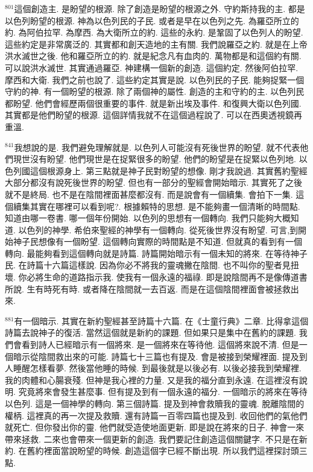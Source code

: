 \documentclass{book}
\begin{document}
$^{801}$這個創造主.
是盼望的根源.
除了創造是盼望的根源之外.
守約斯持我的主.
都是以色列盼望的根源.
神為以色列民的子民.
或者是早在以色列之先.
為羅亞所立的約.
為阿伯拉罕.
為摩西.
為大衛所立的約.
這些的永約.
是鞏固了以色列人的盼望.
這些約定是非常廣泛的.
其實都和創天造地的主有關.
我們說羅亞之約.
就是在上帝洪水滅世之後.
他和羅亞所立的約.
就是紀念凡有血肉的.
萬物都是和這個約有關.
可以說洪水滅世.
其實通過羅亞.
神建構一個新的創造.
這個約定.
然後阿伯拉罕.
摩西和大衛.
我們之前也說了.
這些約定其實是說.
以色列民的子民.
能夠捉緊一個守約的神.
有一個盼望的根源.
除了兩個神的屬性.
創造的主和守約的主.
以色列民都盼望.
他們會經歷兩個很重要的事件.
就是新出埃及事件.
和復興大衛以色列國.
其實都是他們盼望的根源.
這個詳情我就不在這個過程說了.
可以在西奧透視鏡再重溫.

$^{841}$我想說的是.
我們避免理解就是.
以色列人可能沒有死後世界的盼望.
就不代表他們現世沒有盼望.
他們現世是在捉緊很多的盼望.
他們的盼望是在捉緊以色列地.
以色列國這個根源身上.
第三點就是神子民對盼望的想像.
剛才我說過.
其實舊約聖經大部分都沒有說死後世界的盼望.
但也有一部分的聖經會開始暗示.
其實死了之後就不是終局.
也不是在陰間裡面甚麼都沒有.
而是說會有一個續集.
會拍下一集.
這個續集其實在哪裡可以看到呢?.
根據賴特的思想.
是不能夠畫一個清晰的時間點.
知道由哪一卷書.
哪一個年份開始.
以色列的思想有一個轉向.
我們只能夠大概知道.
以色列的神學.
希伯來聖經的神學有一個轉向.
從死後世界沒有盼望.
可言,到開始神子民想像有一個盼望.
這個轉向實際的時間點是不知道.
但就真的看到有一個轉向.
最能夠看到這個轉向就是詩篇.
詩篇開始暗示有一個未知的將來.
在等待神子民.
在詩篇十六篇這樣說.
因為你必不將我的靈魂撇在陰間.
也不叫你的聖者見扭壞.
你必將生命的道路指示我.
使我有一個永遠的福祿.
即是說陰間再不是像傳道書所說.
生有時死有時.
或者降在陰間就一去百返.
而是在這個陰間裡面會被拯救出來.

$^{881}$有一個暗示.
其實在新約聖經甚至詩篇十六篇.
在《士童行典》二章.
比得拿這個詩篇去說神子的復活.
當然這個就是新約的課題.
但如果只是集中在舊約的課題.
我們會看到詩人已經暗示有一個將來.
是一個將來在等待他.
這個將來說不清.
但是一個暗示從陰間救出來的可能.
詩篇七十三篇也有提及.
會是被接到榮耀裡面.
提及到人睡醒怎樣看夢.
然後當他睡的時候.
到最後就是以後必有.
以後必接我到榮耀裡.
我的肉體和心腸衰殘.
但神是我心裡的力量.
又是我的福分直到永遠.
在這裡沒有說明.
究竟將來會發生甚麼事.
但有提及到有一個永遠的福分.
一個暗示的將來在等待以色列.
這是一個神學的轉向.
第三個詩篇.
提及到神會救贖我的靈魂.
脫離陰間的權柄.
這裡真的再一次提及救贖.
還有詩篇一百零四篇也提及到.
收回他們的氣他們就死亡.
但你發出你的靈.
他們就受造使地面更新.
即是說在將來的日子.
神會一來帶來拯救.
二來也會帶來一個更新的創造.
我們要記住創造這個關鍵字.
不只是在新約.
在舊約裡面當說盼望的時候.
創造這個字已經不斷出現.
所以我們這裡探討頭三點.
\end{document}
